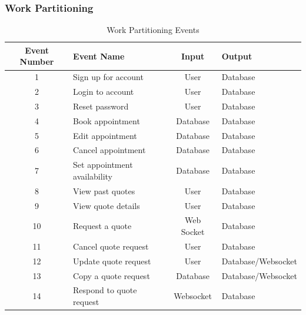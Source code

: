 \documentclass[12pt]{article}
\begin{document}
\newpage
\subsubsection{Work Partitioning}
\begin{table}[H]
	\caption{Work Partitioning Events}
	\centering
	\begin{tabular}{|c|p{3.5cm}|c|p{3.5cm}|}
		\hline
		\textbf{Event Number} & \centering\textbf{Event Name}  & \textbf{Input} & \textbf{Output}    \\
		\hline
		1                     & Sign up for account            & User           & Database           \\
		\hline
		2                     & Login to account               & User           & Database           \\
		\hline
		3                     & Reset password                 & User           & Database           \\
		\hline
		4                     & Book appointment               & Database       & Database           \\
		\hline
		5                     & Edit appointment               & Database       & Database           \\
		\hline
		6                     & Cancel appointment             & Database       & Database           \\
		\hline
		7                     & Set appointment availability   & Database       & Database           \\
		\hline
		8                     & View past quotes               & User           & Database           \\
		\hline
		9                     & View quote details             & User           & Database           \\
		\hline
		10                    & Request a quote                & Web Socket     & Database           \\
		\hline
		11                    & Cancel quote request           & User           & Database           \\
		\hline
		12                    & Update quote request           & User           & Database/Websocket \\
		\hline
		13                    & Copy a quote request           & Database       & Database/Websocket \\
		\hline
		14                    & Respond to quote request       & Websocket      & Database           \\
		\hline

\end{tabular}
\end{table}
\end{document}
